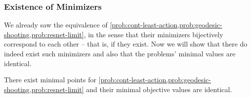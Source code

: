 \subsubsection{Existence of Minimizers}

We already saw the equivalence of \cref{prob:cont-least-action,prob:geodesic-shooting,prob:resnet-limit}, in the sense that their minimizers bijectively correspond to each other -- that is, if they exist.
Now we will show that there do indeed exist such minimizers and also that the problems' minimal values are identical.
\begin{theorem}
	\label{theo:continuous-solutions-existence}
		There exist minimal points for \cref{prob:cont-least-action,prob:geodesic-shooting,prob:resnet-limit} and their minimal objective values are identical.
\end{theorem}

